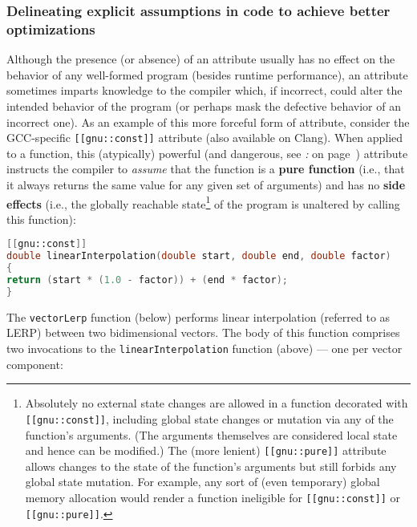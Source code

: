 \subsubsection[Delineating explicit assumptions in code to achieve better optimizations]{Delineating explicit assumptions in code to achieve better optimizations}\label{delineating-explicit-assumptions-in-code-to-achieve-better-optimizations}

Although the presence (or absence) of an attribute usually has no effect
on the behavior of any well-formed program (besides runtime performance),
an attribute sometimes imparts knowledge to the compiler
which, if incorrect, could alter the intended behavior of the program
(or perhaps mask the defective behavior of an incorrect one). As an
example of this more forceful form of attribute, consider the
GCC-specific \texttt{[[gnu::const]]} attribute (also available on
Clang). When applied to a function, this (atypically) powerful (and
dangerous, see {\it{}:} {\it{}} on page~\pageref{some-attributes,-if-misused,-can-affect-program-correctness}) attribute instructs the compiler to \emph{assume}
that the function is a \textbf{pure function} (i.e., that it always
returns the same value for any given set of arguments) and has no
\textbf{side effects} (i.e., the globally reachable
state{\cprotect\footnote{Absolutely no external state changes are
allowed in a function decorated with \texttt{[[gnu::const]]},
including global state changes or mutation via any of the function's
arguments. (The arguments themselves are considered local state and
hence can be modified.) The (more lenient) \texttt{[[gnu::pure]]}
attribute allows changes to the state of the function's arguments but still
forbids any global state mutation. For example, any sort of (even
temporary) global memory allocation would render a function ineligible
for \texttt{[[gnu::const]]} or \texttt{[[gnu::pure]]}.}} of the
program is unaltered by calling this function):

\begin{lstlisting}[language=C++]
[[gnu::const]]
double linearInterpolation(double start, double end, double factor)
{
return (start * (1.0 - factor)) + (end * factor);
}
\end{lstlisting}

\noindent The \texttt{vectorLerp} function (below) performs linear
interpolation (referred to as LERP) between two bidimen\-sional vectors. The body
of this function comprises two invocations to the
\mbox{\texttt{linearInterpolation}} function (above) --- one per vector
component:

